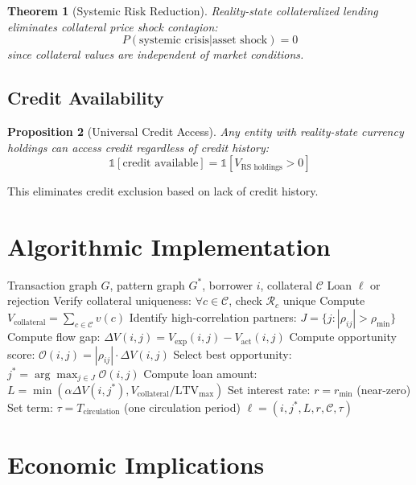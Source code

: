 \documentclass[12pt]{article}
\newtheorem{theorem}{Theorem}
\newtheorem{proposition}[theorem]{Proposition}
\begin{document}
\begin{theorem}[Systemic Risk Reduction]
Reality-state collateralized lending eliminates collateral price shock contagion:
$$
P(\text{systemic crisis} | \text{asset shock}) = 0
$$
since collateral values are independent of market conditions.
\end{theorem}

\subsection{Credit Availability}

\begin{proposition}[Universal Credit Access]
Any entity with reality-state currency holdings can access credit regardless of credit history:
$$
\mathbb{1}[\text{credit available}] = \mathbb{1}[V_{\text{RS holdings}} > 0]
$$
\end{proposition}

This eliminates credit exclusion based on lack of credit history.

\section{Algorithmic Implementation}

\begin{algorithm}
\caption{Reality-State Collateralized Loan Issuance}
\begin{algorithmic}[1]
\REQUIRE Transaction graph $G$, pattern graph $G^*$, borrower $i$, collateral $\mathcal{C}$
\ENSURE Loan $\ell$ or rejection
\STATE Verify collateral uniqueness: $\forall c \in \mathcal{C}$, check $\mathcal{R}_c$ unique
\STATE Compute $V_{\text{collateral}} = \sum_{c \in \mathcal{C}} v(c)$
\STATE Identify high-correlation partners: $J = \{j: |\rho_{ij}| > \rho_{\min}\}$
    \STATE Compute flow gap: $\Delta V(i,j) = V_{\text{exp}}(i,j) - V_{\text{act}}(i,j)$
    \STATE Compute opportunity score: $\mathcal{O}(i,j) = |\rho_{ij}| \cdot \Delta V(i,j)$
\ENDFOR
\STATE Select best opportunity: $j^* = \arg\max_{j \in J} \mathcal{O}(i,j)$
\STATE Compute loan amount: $L = \min(\alpha\Delta V(i,j^*), V_{\text{collateral}}/\text{LTV}_{\max})$
\STATE Set interest rate: $r = r_{\text{min}}$ (near-zero)
\STATE Set term: $\tau = T_{\text{circulation}}$ (one circulation period)
\RETURN $\ell = (i, j^*, L, r, \mathcal{C}, \tau)$
\end{algorithmic}
\end{algorithm}

\section{Economic Implications}
\end{document}

